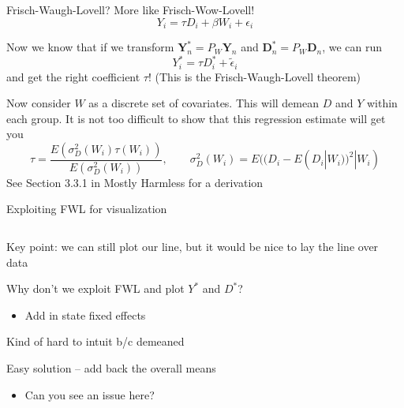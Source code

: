 \documentclass[notes,11pt, aspectratio=169]{beamer}
\newenvironment{wideitemize}{\itemize\addtolength{\itemsep}{10pt}}{\enditemize}
\begin{document}
\begin{frame}{Frisch-Waugh-Lovell? More like Frisch-Wow-Lovell!}
  $$ Y_{i} = \tau D_{i} + \beta W_{i} + \epsilon_{i}$$
  \begin{wideitemize}
  \item Now we know that if we transform $\mathbf{Y}_{n}^{*} = P_{W}\mathbf{Y}_{n}$ and $\mathbf{D}_{n}^{*} = P_{W}\mathbf{D}_{n}$, we can run
    $$ Y_{i}^{*} = \tau D^{*}_{i} +  \tilde{\epsilon}_{i}$$
    and get the right coefficient $\tau$! (This is the Frisch-Waugh-Lovell theorem)
  \item Now consider $W$ as a discrete set of covariates. This will
    demean $D$ and $Y$ within each group. It is not too difficult to
    show that this regression estimate will get you
    \begin{equation}
      \tau = \frac{E(\sigma^{2}_{D}(W_{i})\tau(W_{i}))}{E(\sigma^{2}_{D}(W_{i}))}, \qquad \sigma^{2}_{D}(W_{i}) = E((D_{i} - E(D_{i}|W_{i}))^{2} | W_{i})
    \end{equation}
    See Section 3.3.1 in Mostly Harmless for a derivation
  \end{wideitemize}
\end{frame}


\begin{frame}{Exploiting FWL for visualization}
  \begin{columns}[T] %
    \begin{column}{.5\textwidth}
  \begin{wideitemize}
  \item<1-> Key point: we can still plot our line, but it would be nice to
    lay the line over data
  \item<1-> Why don't we exploit FWL and plot $Y^{*}$ and  $D^{*}$?
    \begin{itemize}
    \item Add in state fixed effects
    \end{itemize}
  \item<1-> Kind of hard to intuit b/c demeaned
  \item<2-> Easy solution -- add back the overall means
    \begin{itemize}
    \item Can you see an issue here?
    \end{itemize}
  \end{wideitemize}
  \end{column}%
  \hfill%
  \begin{column}{.5\textwidth}
  \end{column}
\end{columns}
\end{frame}
\end{document}
